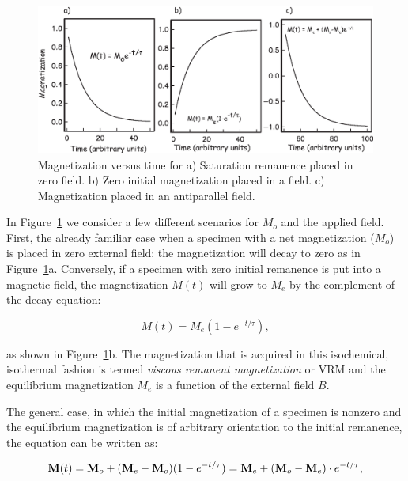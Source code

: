 \begin{figure}[h!tb]
\centering  \includegraphics[width=14 cm]{EPSfiles/vrm1.eps}
\caption{Magnetization versus time for  a) Saturation remanence placed in zero field.   b) Zero initial magnetization placed in a field.  c) Magnetization placed in an antiparallel field.  }
\label{fig:vrm1}
\end{figure}
\eject

In Figure~\ref{fig:vrm1} we consider a few different  scenarios for $M_o$ and the applied field.  First,  the already familiar case when  a specimen with a net magnetization ($M_o$) is placed in zero external field; the magnetization will decay to zero as in Figure~\ref{fig:vrm1}a.  Conversely, if a specimen with zero initial remanence is put into a
magnetic field,
the magnetization $M(t)$ will grow to 
 $M_e$ by the complement of the decay equation:

\begin{equation}
M(t)=M_e(1-e^{-t/\tau}),
\label{eq:vgrow}
\end{equation}
 
\noindent as shown in Figure~\ref{fig:vrm1}b.  
The magnetization that is acquired in this isochemical, isothermal fashion is termed
{\it viscous remanent magnetization} or VRM and the equilibrium magnetization $M_e$ is a function of the external field $B$.

The general case, in which the initial magnetization of a  specimen is
nonzero and the 
equilibrium magnetization is of arbitrary orientation to the initial remanence, the equation can  be written as:

\begin{equation}
\hbox{\bf M}(t)=\hbox{\bf M}_o + (\hbox{\bf M}_e-\hbox{\bf M}_o)(1-e^{-t/\tau}) = \hbox{\bf M}_e + (\hbox{\bf M}_o-\hbox{\bf M}_e)\cdot
e^{-t/\tau},
\label{eq:vrm}
\end{equation}

